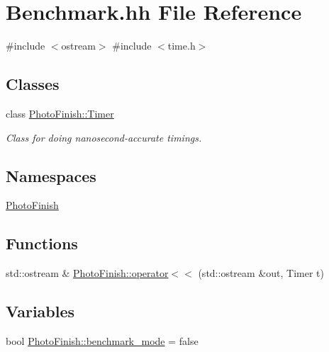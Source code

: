 \hypertarget{_benchmark_8hh}{}\section{Benchmark.\+hh File Reference}
\label{_benchmark_8hh}
{\ttfamily \#include $<$ostream$>$}\newline
{\ttfamily \#include $<$time.\+h$>$}\newline
\subsection*{Classes}
\begin{DoxyCompactItemize}
\item 
class \hyperlink{class_photo_finish_1_1_timer}{Photo\+Finish\+::\+Timer}
\begin{DoxyCompactList}\small\item\em Class for doing nanosecond-\/accurate timings. \end{DoxyCompactList}\end{DoxyCompactItemize}
\subsection*{Namespaces}
\begin{DoxyCompactItemize}
\item 
 \hyperlink{namespace_photo_finish}{Photo\+Finish}
\end{DoxyCompactItemize}
\subsection*{Functions}
\begin{DoxyCompactItemize}
\item 
std\+::ostream \& \hyperlink{namespace_photo_finish_a3044516746909ba15410d161d15ee1c5}{Photo\+Finish\+::operator$<$$<$} (std\+::ostream \&out, Timer t)
\end{DoxyCompactItemize}
\subsection*{Variables}
\begin{DoxyCompactItemize}
\item 
bool \hyperlink{namespace_photo_finish_a9fdd5a183ce1374d876e4f23f1b0fbf3}{Photo\+Finish\+::benchmark\+\_\+mode} = false
\end{DoxyCompactItemize}

